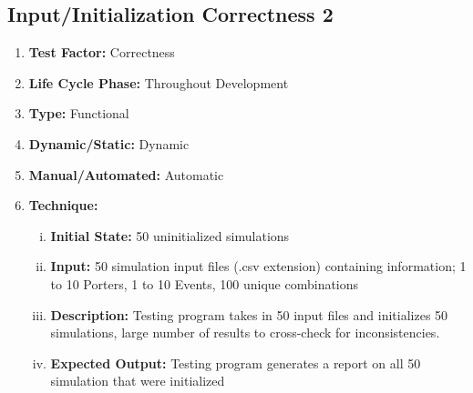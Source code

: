 \documentclass[paper=letter, fontsize=10pt]{scrartcl}
\numberwithin{equation}{section}		%
\numberwithin{figure}{section}			%
\numberwithin{table}{section}				%
\begin{document}
\subsection{Input/Initialization Correctness 2}
\begin{enumerate}[]
	\item \textbf{Test Factor:} Correctness  
	\item \textbf{Life Cycle Phase:} Throughout Development
	\item \textbf{Type:} Functional
	\item \textbf{Dynamic/Static:} Dynamic
	\item \textbf{Manual/Automated:} Automatic
	\item \textbf{Technique:}
		\begin{enumerate}[(i)]
			\item \textbf{Initial State:} 50 uninitialized simulations   
			\item \textbf{Input:} 50 simulation input files (.csv extension) containing information; 1 to 10 Porters,  1 to 10 Events, 100 unique combinations
			\item \textbf{Description:} Testing program takes in 50 input files and initializes 50 simulations, large number of results to cross-check for inconsistencies.
			\item \textbf{Expected Output:} Testing program generates a report on all 50 simulation that were initialized 
		\end{enumerate}
\end{enumerate}
\end{document}
